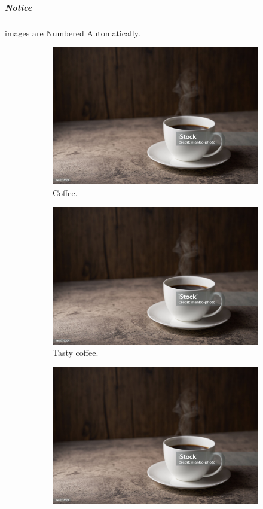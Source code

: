 \documentclass{report}[a4paper,12pt] %
\begin{document}
\subparagraph{Notice} images are Numbered Automatically.

\begin{figure}[h!]
  \centering
  \begin{subfigure}[b]{0.2\linewidth}
    \includegraphics[width=\linewidth]{coffee.jpg}
     \caption{Coffee.}
  \end{subfigure}
  \begin{subfigure}[b]{0.2\linewidth}
    \includegraphics[width=\linewidth]{coffee.jpg}
    \caption{Tasty coffee.}
  \end{subfigure}
  \begin{subfigure}[b]{0.2\linewidth}
    \includegraphics[width=\linewidth]{coffee.jpg}

\end{subfigure}
\end{figure}
\end{document}
